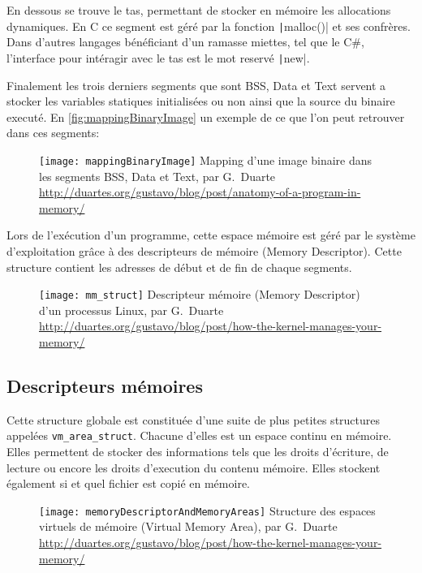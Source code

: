 En dessous se trouve le tas, permettant de stocker en mémoire les allocations dynamiques. En C ce segment est géré par la fonction \texttt|malloc()| et ses confrères. Dans d'autres langages bénéficiant d'un ramasse miettes, tel que le C\#, l'interface pour intéragir avec le tas est le mot reservé \texttt|new|.

Finalement les trois derniers segments que sont BSS, Data et Text servent a stocker les variables statiques initialisées ou non ainsi que la source du binaire executé. En \autoref{fig:mappingBinaryImage} un exemple de ce que l'on peut retrouver dans ces segments:

\begin{figure}[H]
	\centering
	\texttt{[image: mappingBinaryImage]}
	{Mapping d'une image binaire dans les segments BSS, Data et Text, par G.~Duarte}
	{\url{http://duartes.org/gustavo/blog/post/anatomy-of-a-program-in-memory/}}
	\label{fig:mappingBinaryImage}
\end{figure}

Lors de l'exécution d'un programme, cette espace mémoire est géré par le système d'exploitation grâce à des descripteurs de mémoire (Memory Descriptor). Cette structure contient les adresses de début et de fin de chaque segments.

\begin{figure}[H]
	\centering
	\texttt{[image: mm\_struct]}
	{Descripteur mémoire (Memory Descriptor) d'un processus Linux, par G.~Duarte}
	{\url{http://duartes.org/gustavo/blog/post/how-the-kernel-manages-your-memory/}}
	\label{fig:mm_struct}
\end{figure}

\subsection{Descripteurs mémoires}

Cette structure globale est constituée d'une suite de plus petites structures appelées \texttt{vm_area_struct}. Chacune d'elles est un espace continu en mémoire. Elles permettent de stocker des informations tels que les droits d'écriture, de lecture ou encore les droits d'execution du contenu mémoire. Elles stockent également si et quel fichier est copié en mémoire.

\begin{figure}[H]
	\centering
	\texttt{[image: memoryDescriptorAndMemoryAreas]}
	{Structure des espaces virtuels de mémoire (Virtual Memory Area), par G.~Duarte}
	{\url{http://duartes.org/gustavo/blog/post/how-the-kernel-manages-your-memory/}}
	\label{fig:memoryDescriptorAndMemoryAreas}
\end{figure}

